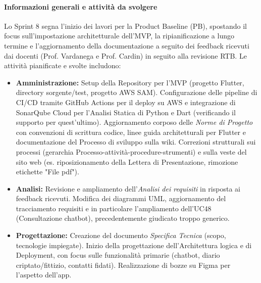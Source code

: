 \documentclass[a4paper,12pt]{article}
\newcommand{\ignoreglossary}{}
\begin{document}
\paragraph{Informazioni generali e attività da svolgere}
Lo Sprint 8 segna l'inizio dei lavori per la Product Baseline (PB), spostando il focus sull'impostazione architetturale dell'MVP, la ripianificazione a lungo termine e l'aggiornamento della documentazione a seguito dei feedback ricevuti dai docenti (Prof. Vardanega e Prof. Cardin) in seguito alla revisione RTB.
Le attività pianificate e svolte includono:
\begin{itemize}
    \item {\sloppy \textbf{Amministrazione:} Setup della Repository per l'MVP (progetto Flutter, directory sorgente/test, progetto AWS SAM). Configurazione delle pipeline di CI/CD tramite GitHub Actions per il deploy su AWS e integrazione di SonarQube \ignoreglossary{Cloud} per l'Analisi Statica di Python e Dart (verificando il supporto per quest'ultimo). Aggiornamento corposo delle \textit{Norme di Progetto} con convenzioni di scrittura codice, linee guida architetturali per Flutter e documentazione del Processo di sviluppo sulla wiki. Correzioni strutturali sui processi (gerarchia Processo-attività-procedure-strumenti) e sulla veste del sito web (es. riposizionamento della Lettera di Presentazione, rimozione etichette "File pdf"). \par}
    \item \textbf{Analisi:} Revisione e ampliamento dell'\textit{Analisi dei requisiti} in risposta ai feedback ricevuti. Modifica dei diagrammi UML, aggiornamento del tracciamento requisiti e in particolare l'ampliamento dell'UC48 (Consultazione chatbot), precedentemente giudicato troppo generico.
    \item \textbf{Progettazione:} Creazione del documento \textit{Specifica Tecnica} (scopo, tecnologie impiegate). Inizio della progettazione dell'Architettura logica e di Deployment, con focus sulle funzionalità primarie (chatbot, diario criptato/fittizio, contatti fidati). Realizzazione di bozze su Figma per l'aspetto dell'app.
\end{itemize}
\end{document}
